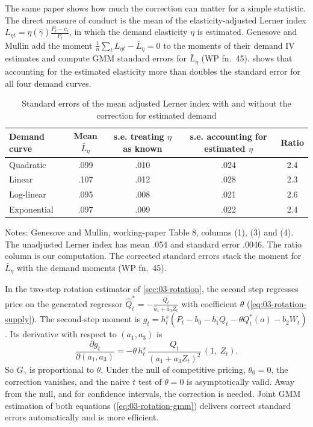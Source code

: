 The same paper shows how much the correction can matter for a simple statistic. The direct measure of conduct is the mean
of the elasticity-adjusted Lerner index $L_{\eta t} = \eta(\hat\gamma)\frac{P_t - c_t}{P_t}$, in which the demand elasticity
$\eta$ is estimated. Genesove and Mullin add the moment $\frac{1}{n}\sum_t L_{\eta t} - \bar L_\eta = 0$ to the moments of
their demand IV estimates and compute GMM standard errors for $\bar L_\eta$ (WP fn.~45).  shows that
accounting for the estimated elasticity more than doubles the standard error for all four demand curves.

\begin{table}[htbp]
\centering
\caption{Standard errors of the mean adjusted Lerner index with and without the correction for estimated demand}
\label{tab:A-gm-lerner}
\small
\begin{tabular}{lcccc}
\toprule
Demand curve & Mean $\bar L_\eta$ & \makecell{s.e. treating\\ $\eta$ as known} & \makecell{s.e. accounting for\\
estimated $\eta$} & Ratio \\
\midrule
Quadratic & .099 & .010 & .024 & 2.4 \\
Linear & .107 & .012 & .028 & 2.3 \\
Log-linear & .095 & .008 & .021 & 2.6 \\
Exponential & .097 & .009 & .022 & 2.4 \\
\bottomrule
\end{tabular}
\par\smallskip
\parbox{\linewidth}{\footnotesize Notes: Genesove and Mullin, working-paper Table 8, columns (1), (3) and (4). The unadjusted Lerner index has
mean .054 and standard error .0046. The ratio column is our computation. The corrected standard errors stack the moment
for $\bar L_\eta$ with the demand moments (WP fn.~45).}
\end{table}

In the two-step rotation estimator of \cref{sec:03-rotation}, the second step regresses price on the generated regressor
$\hat Q^*_t = -\frac{Q_t}{\hat a_1 + \hat a_3Z_t}$ with coefficient $\theta$ (\cref{eq:03-rotation-supply}). The second-step
moment is $g_t = h^s_t(P_t - b_0 - b_1Q_t - \theta Q^*_t(a) - b_2W_t)$. Its derivative with respect to $(a_1, a_3)$ is
\begin{equation*}
  \frac{\partial g_t}{\partial(a_1, a_3)} = -\theta\,h^s_t\,\frac{Q_t}{(a_1 + a_3Z_t)^2}\,(1,\ Z_t).
\end{equation*}
So $G_\gamma$ is proportional to $\theta$. Under the null of competitive pricing, $\theta_0 = 0$, the correction vanishes,
and the naive $t$ test of $\theta = 0$ is asymptotically valid. Away from the null, and for confidence intervals, the
correction is needed. Joint GMM estimation of both equations (\cref{eq:03-rotation-gmm}) delivers correct standard errors
automatically and is more efficient.

